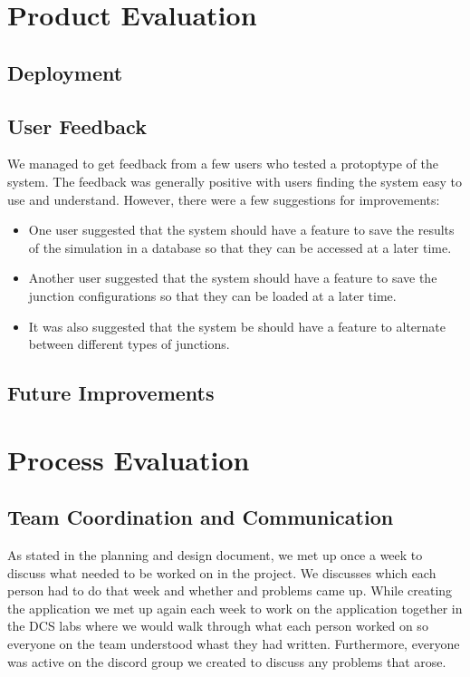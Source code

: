 \documentclass{article}
\begin{document}
\section{Product Evaluation}

    \subsection{Deployment}

    \subsection{User Feedback}

    We managed to get feedback from a few users who tested a protoptype of the system. The feedback was generally positive with users finding the system easy to use and understand. However, there were a few suggestions for improvements:

    \begin{itemize}
        \item One user suggested that the system should have a feature to save the results of the simulation in a database so that they can be accessed at a later time.
        \item Another user suggested that the system should have a feature to save the junction configurations so that they can be loaded at a later time.
        \item It was also suggested that the system be should have a feature to alternate between different types of junctions.
    \end{itemize}

    \subsection{Future Improvements}

\section{Process Evaluation}

    \subsection{Team Coordination and Communication}
    As stated in the planning and design document, we met up once a week to discuss what needed to be worked on in the project. We discusses which each person had to do that week and whether and problems came up. While creating the application we met up again each week to work on the application together in the DCS labs where we would walk through what each person worked on so everyone on the team understood whast they had written. Furthermore, everyone was active on the discord group we created to discuss any problems that arose.
\end{document}
